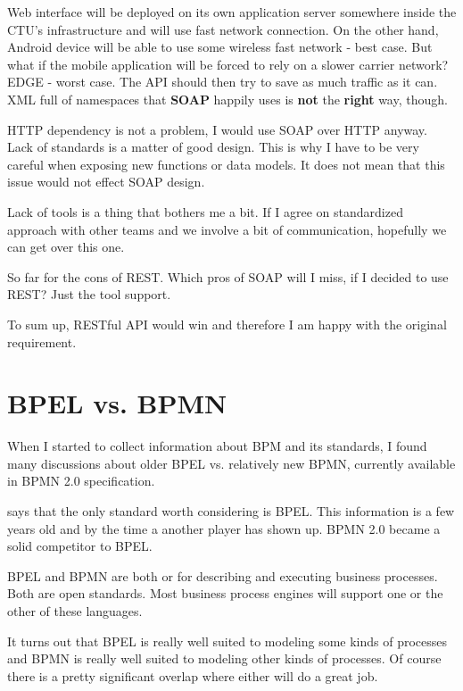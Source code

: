 	Web interface will be deployed on its own application server somewhere inside the CTU's infrastructure and will use
	fast network connection. On the other hand, Android device will be able to use some wireless fast network - best case.
	But what if the mobile application will be forced to rely on a slower carrier network? EDGE - worst case. The API
	should then try to save as much traffic as it can. XML full of namespaces that \textbf{SOAP} happily uses is
	\textbf{not} the \textbf{right} way, though.
	
	HTTP dependency is not a problem, I would use SOAP over HTTP anyway. Lack of standards is a matter of good design. This
	is why I have to be very careful when exposing new functions or data models. It does not mean that this issue would not
	effect SOAP design.
	
	Lack of tools is a thing that bothers me a bit. If I agree on standardized approach with other teams and we involve a
	bit of communication, hopefully we can get over this one.
	
	So far for the cons of REST. Which pros of SOAP will I miss, if I decided to use REST? Just the tool support.
	
	To sum up, RESTful API would win and therefore I am happy with the original requirement.
	
	\section{BPEL vs. BPMN}
	
	When I started to collect information about BPM and its standards, I found many discussions about older BPEL vs.
	relatively new BPMN, currently available in BPMN 2.0 specification.
	
	\cite{bpm} says that the only standard worth considering is BPEL. This information is a few years old and by the time a
	another player has shown up. BPMN 2.0 became a solid competitor to BPEL.
	
	\cite{oracle_architecture_standards}
	BPEL and BPMN are both  or  for describing and executing business processes. Both are open
	standards. Most business process engines will support one or the other of these languages.
	
	It turns out that BPEL is really well suited to modeling some kinds of processes and BPMN is really well suited to
	modeling other kinds of processes. Of course there is a pretty significant overlap where either will do a great job.
	
